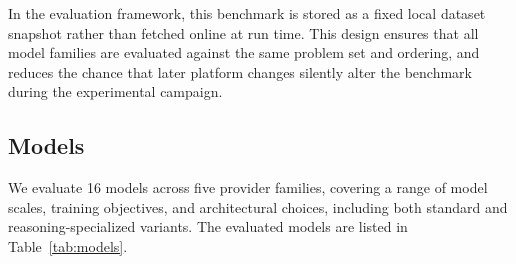 \documentclass[11pt]{article}
\begin{document}
In the evaluation framework, this benchmark is stored as a fixed local dataset snapshot rather than fetched online at run time. This design ensures that all model families are evaluated against the same problem set and ordering, and reduces the chance that later platform changes silently alter the benchmark during the experimental campaign.

\subsection{Models}

We evaluate 16 models across five provider families, covering a range of model scales, training objectives, and architectural choices, including both standard and reasoning-specialized variants. The evaluated models are listed in Table~\ref{tab:models}.

\begin{table}[t]
\centering
\small
\caption{Models evaluated in this study, grouped by provider family. $\dagger$ denotes reasoning-specialized models. Display names in this table are editorial labels derived from API identifier strings; they are not official product version names. Exact API identifiers and access dates are listed in Appendix~\ref{sec:model-snapshots}. Google models marked ``(preview)'' were accessed via preview-tier API endpoints.}
\label{tab:models}
\end{table}
\end{document}
